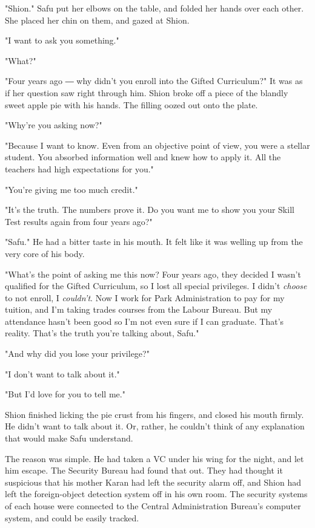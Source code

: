 \mybreak

"Shion." Safu put her elbows on the table, and folded her hands over
each other. She placed her chin on them, and gazed at Shion.

"I want to ask you something."

"What?"

"Four years ago ― why didn't you enroll into the Gifted Curriculum?" It
was as if her question saw right through him. Shion broke off a piece of
the blandly sweet apple pie with his hands. The filling oozed out onto
the plate.

\myspace

"Why're you asking now?"

"Because I want to know. Even from an objective point of view, you were
a stellar student. You absorbed information well and knew how to apply
it. All the teachers had high expectations for you."

"You're giving me too much credit."

"It's the truth. The numbers prove it. Do you want me to show you your
Skill Test results again from four years ago?"

"Safu." He had a bitter taste in his mouth. It felt like it was welling
up from the very core of his body.

"What's the point of asking me this now? Four years ago, they decided I
wasn't qualified for the Gifted Curriculum, so I lost all special
privileges. I didn't \emph{choose} to not enroll, I \emph{couldn't}. Now I work for
Park Administration to pay for my tuition, and I'm taking trades courses
from the Labour Bureau. But my attendance hasn't been good so I'm not
even sure if I can graduate. That's reality. That's the truth you're
talking about, Safu."

"And why did you lose your privilege?"

"I don't want to talk about it."

"But I'd love for you to tell me."

Shion finished licking the pie crust from his fingers, and closed his
mouth firmly. He didn't want to talk about it. Or, rather, he couldn't
think of any explanation that would make Safu understand.

The reason was simple. He had taken a VC under his wing for the night,
and let him escape. The Security Bureau had found that out. They had
thought it suspicious that his mother Karan had left the security alarm
off, and Shion had left the foreign-object detection system off in his
own room. The security systems of each house were connected to the
Central Administration Bureau's computer system, and could be easily
tracked.


